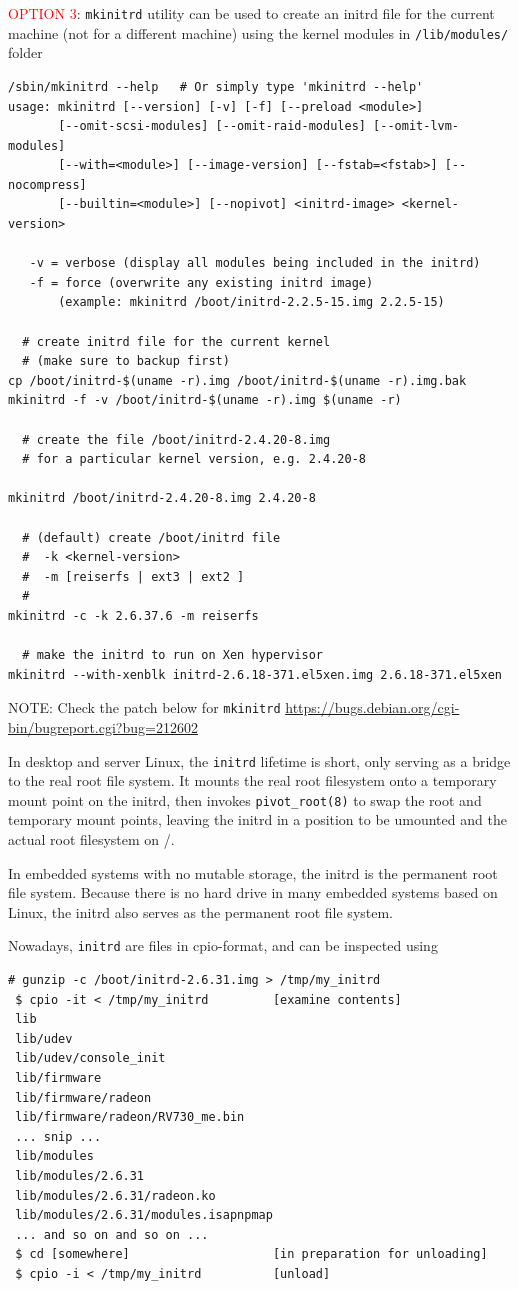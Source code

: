 \textcolor{red}{OPTION 3}: \verb!mkinitrd!  utility
can be used to create an initrd file for the current machine (not for a
different machine) using the kernel modules in  \verb!/lib/modules/! folder
\begin{verbatim}
/sbin/mkinitrd --help   # Or simply type 'mkinitrd --help'
usage: mkinitrd [--version] [-v] [-f] [--preload <module>]
       [--omit-scsi-modules] [--omit-raid-modules] [--omit-lvm-modules]
       [--with=<module>] [--image-version] [--fstab=<fstab>] [--nocompress]
       [--builtin=<module>] [--nopivot] <initrd-image> <kernel-version>
  
   -v = verbose (display all modules being included in the initrd)
   -f = force (overwrite any existing initrd image)
       (example: mkinitrd /boot/initrd-2.2.5-15.img 2.2.5-15)
       
  # create initrd file for the current kernel
  # (make sure to backup first)
cp /boot/initrd-$(uname -r).img /boot/initrd-$(uname -r).img.bak  
mkinitrd -f -v /boot/initrd-$(uname -r).img $(uname -r)  
         
  # create the file /boot/initrd-2.4.20-8.img
  # for a particular kernel version, e.g. 2.4.20-8
   
mkinitrd /boot/initrd-2.4.20-8.img 2.4.20-8

  # (default) create /boot/initrd file
  #  -k <kernel-version>
  #  -m [reiserfs | ext3 | ext2 ]   
  #     
mkinitrd -c -k 2.6.37.6 -m reiserfs

  # make the initrd to run on Xen hypervisor
mkinitrd --with-xenblk initrd-2.6.18-371.el5xen.img 2.6.18-371.el5xen  
\end{verbatim}
NOTE: Check the patch below for \verb!mkinitrd!
\url{https://bugs.debian.org/cgi-bin/bugreport.cgi?bug=212602}


In desktop and server Linux, the \verb!initrd! lifetime is short, only serving
as a bridge to the real root file system. It mounts the real root filesystem
onto a temporary mount point on the initrd, then invokes \verb!pivot_root(8)! to
swap the root and temporary mount points, leaving the initrd in a position to be
umounted and the actual root filesystem on /.

In embedded systems with no mutable storage, the initrd is the permanent root
file system. Because there is no hard drive in many embedded systems based on
Linux, the initrd also serves as the permanent root file system.

  

Nowadays, \verb!initrd! are files in cpio-format, and can be inspected using
\begin{verbatim}
# gunzip -c /boot/initrd-2.6.31.img > /tmp/my_initrd
 $ cpio -it < /tmp/my_initrd         [examine contents]
 lib
 lib/udev
 lib/udev/console_init
 lib/firmware
 lib/firmware/radeon
 lib/firmware/radeon/RV730_me.bin
 ... snip ...
 lib/modules
 lib/modules/2.6.31
 lib/modules/2.6.31/radeon.ko
 lib/modules/2.6.31/modules.isapnpmap
 ... and so on and so on ...
 $ cd [somewhere]                    [in preparation for unloading]
 $ cpio -i < /tmp/my_initrd          [unload] 
\end{verbatim}

